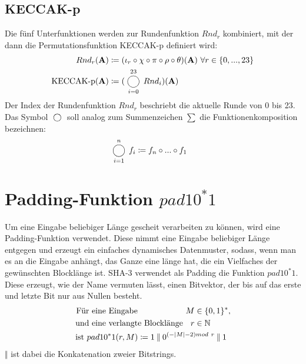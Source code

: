 \subsection{KECCAK-p}
Die fünf Unterfunktionen werden zur Rundenfunktion $Rnd_r$ kombiniert, mit der dann die Permutationsfunktion KECCAK-p definiert wird:
\begin{align*}
	Rnd_r(\textbf{A}) & \coloneq (\iota_r \circ \chi \circ \pi \circ \rho \circ \theta)(\textbf{A})\ \forall r \in \{0,...,23\} \\
    \text{KECCAK-p} (\textbf{A}) & \coloneq (\bigcomp_{i = 0}^{23} Rnd_i)(\textbf{A}) \\
\end{align*}
Der Index der Rundenfunktion $Rnd_r$ beschriebt die aktuelle Runde von 0 bis 23. Das Symbol $\bigcomp$ soll analog zum Summenzeichen $\sum$
die Funktionenkomposition bezeichnen:
\begin{align*}
    \bigcomp_{i = 1}^{n}f_i & \coloneq f_n \circ ... \circ f_1
\end{align*}

\section{Padding-Funktion $pad10^*1$}
Um eine Eingabe beliebiger Länge gescheit verarbeiten zu können, wird eine Padding-Funktion verwendet.
Diese nimmt eine Eingabe beliebiger Länge entgegen und erzeugt ein einfaches dynamisches Datenmuster,
sodass, wenn man es an die Eingabe anhängt, das Ganze eine länge hat, die ein Vielfaches der gewünschten Blocklänge ist.
SHA-3 verwendet als Padding die Funktion $pad10^*1$. Diese erzeugt, wie der Name vermuten lässt,
einen Bitvektor, der bis auf das erste und letzte Bit nur aus Nullen besteht.
\begin{align*}
	&\begin{alignedat}[t]{2}
	\text{Für} & \text{ eine Eingabe } & M & \in \{0,1\}^*, \\
	\text{und} & \text{ eine verlangte Blocklänge } & r & \in \mathbb{N} \\
	\end{alignedat} \\
	& \text{ist } pad10^*1(r, M) \coloneq 1 \mathbin\Vert 0^{(-|M| - 2) mod\ r} \mathbin\Vert 1
\end{align*}
$\mathbin\Vert$ ist dabei die Konkatenation zweier Bitstrings.

